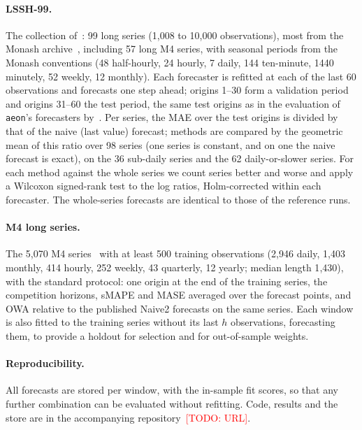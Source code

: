 \documentclass[11pt]{article}
\newcommand{\todo}[1]{\textcolor{red}{[TODO: #1]}}
\begin{document}
\paragraph{LSSH-99.}
The collection of~\citet{banwell26forecasting}: 99 long series (1{,}008 to
10{,}000 observations), most from the Monash archive~\citep{godahewa21monash},
including 57 long M4 series, with seasonal periods from the Monash conventions
(48 half-hourly, 24 hourly, 7 daily, 144 ten-minute, 1440 minutely, 52 weekly,
12 monthly). Each forecaster is refitted at each of the last 60 observations
and forecasts one step ahead; origins 1--30 form a validation period and
origins 31--60 the test period, the same test origins as in the evaluation of
\texttt{aeon}'s forecasters by~\citet{banwell26forecasting}. Per series, the
MAE over the test origins is divided by that of the naive (last value)
forecast; methods are compared by the geometric mean of this ratio over 98
series (one series is constant, and on one the naive forecast is exact), on
the 36 sub-daily series and the 62 daily-or-slower series. For each method
against the whole series we count series better and worse and apply a
Wilcoxon signed-rank test to the log ratios, Holm-corrected within each
forecaster. The whole-series forecasts are identical to those of the reference
runs.

\paragraph{M4 long series.}
The 5{,}070 M4 series~\citep{makridakis20m4} with at least 500 training
observations (2{,}946 daily, 1{,}403 monthly, 414 hourly, 252 weekly, 43
quarterly, 12 yearly; median length 1{,}430), with the standard protocol: one
origin at the end of the training series, the competition horizons, sMAPE and
MASE averaged over the forecast points, and OWA relative to the published
Naive2 forecasts on the same series. Each window is also fitted to the training
series without its last $h$ observations, forecasting them, to provide a
holdout for selection and for out-of-sample weights.

\paragraph{Reproducibility.}
All forecasts are stored per window, with the in-sample fit scores, so that any
further combination can be evaluated without refitting. Code, results and the
store are in the accompanying repository~\todo{URL}.
\end{document}
